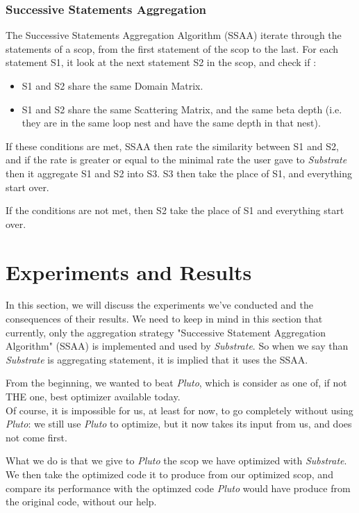 \documentclass[paper=a4, fontsize=11.5pt]{scrartcl}
\numberwithin{equation}{section}        %
\numberwithin{figure}{section}          %
\numberwithin{table}{section}               %
\begin{document}
        \subsubsection{Successive Statements Aggregation}
            The Successive Statements Aggregation Algorithm (SSAA) iterate through
            the statements of a scop, from the first statement of the scop to the last.
            For each statement S1, it look at the next statement S2 in the scop, and
            check if :
            \begin{itemize}
                \item S1 and S2 share the same Domain Matrix.
                \item S1 and S2 share the same Scattering Matrix, and the same beta depth
                    (i.e. they are in the same loop nest and have the same depth in that nest).
            \end{itemize}
            If these conditions are met, SSAA then rate the similarity between S1 and S2,
            and if the rate is greater or equal to the minimal rate the user gave to \textit{Substrate}
            then it aggregate S1 and S2 into S3. S3 then take the place of S1, and everything start
            over.

            If the conditions are not met, then S2 take the place of S1 and everything start over.
            

\section{Experiments and Results}
In this section, we will discuss the experiments we've conducted and the consequences
of their results.
We need to keep in mind in this section that currently, only the aggregation strategy 
"Successive Statement Aggregation Algorithm" (SSAA) is implemented and used by \textit{Substrate}.
So when we say than \textit{Substrate} is aggregating statement, it is implied that it uses
the SSAA.

\bigskip

From the beginning, we wanted to beat \textit{Pluto}, which is consider as
one of, if not THE one, best optimizer available today.\\
Of course, it is impossible for us, at least for now, to go completely without using \textit{Pluto}:
we still use \textit{Pluto} to optimize, but it now takes its input from us, and does
not come first.

What we do is that we give to \textit{Pluto} the scop we have optimized with \textit{Substrate}.
We then take the optimized code it to produce from our optimized scop,
and compare its performance with the optimzed code \textit{Pluto} would have produce from
the original code, without our help.
\end{document}
